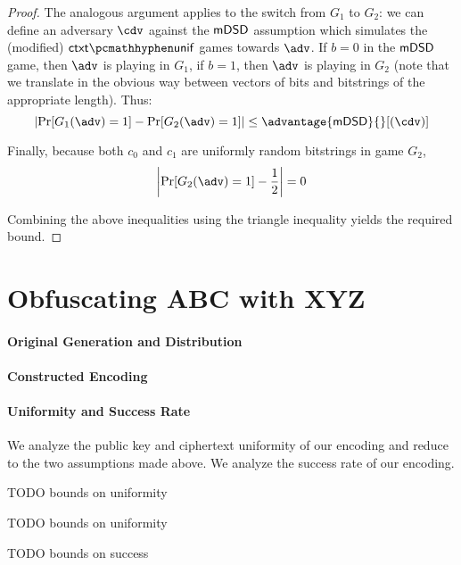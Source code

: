 \begin{proof}
    The analogous argument applies to the switch from $G_1$ to $G_2$: we can define an adversary $\cdv$ against the $\mathsf{mDSD}$ assumption which simulates the (modified) $\ctxtunif$ games towards $\adv$. If $b=0$ in the $\mathsf{mDSD}$ game, then $\adv$ is playing in $G_1$, if $b=1$, then $\adv$ is playing in $G_2$ (note that we translate in the obvious way between vectors of bits and bitstrings of the appropriate length). Thus:
    \[ \left| \Pr[G_1(\adv) = 1] - \Pr[G_2(\adv) = 1] \right| \leq \advantage{\mdsd}{}[(\cdv)] \]

    Finally, because both $c_0$ and $c_1$ are uniformly random bitstrings in game $G_2$,
    \[ \left| \Pr[G_2(\adv) = 1] - \frac{1}{2} \right| = 0 \]

    Combining the above inequalities using the triangle inequality yields the required bound.
\end{proof}

\section{Obfuscating ABC with XYZ} \label{sec:tbd}
\paragraph{Original Generation and Distribution}
\paragraph{Constructed Encoding}
\paragraph{Uniformity and Success Rate}

We analyze the public key and ciphertext uniformity of our encoding and reduce to the two assumptions made above. We analyze the success rate of our encoding.

\begin{lemma} \label{lem:tbd-pk-unif}
    TODO bounds on uniformity
\end{lemma}

\begin{lemma} \label{lem:tbd-ctxt-unif}
    TODO bounds on uniformity
\end{lemma}

\begin{lemma} \label{lem:tbd-first-keygen-success}
    TODO bounds on success
\end{lemma}


